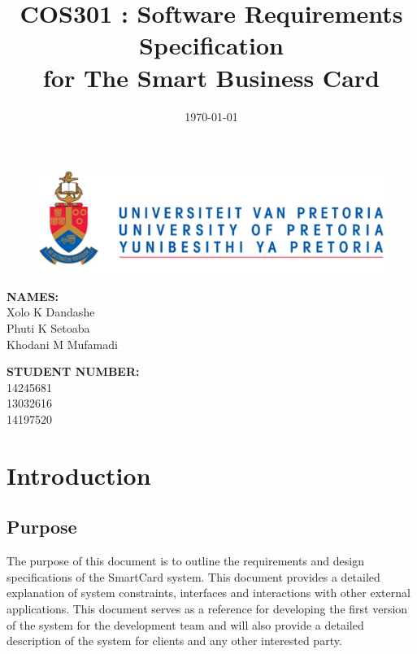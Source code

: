 \documentclass[english]{article}
\title{COS301 : Software Requirements Specification\\
	for The Smart Business Card\\
	}
\date{\today}
\begin{document}
	\maketitle
	\begin{figure}[!t]
		\includegraphics{up_logo.png}
	\end{figure}
	\begin{minipage}{0.4\textwidth}
		\begin{flushleft} \large
			\textbf{NAMES:}\\[0.4cm]
			Xolo K Dandashe\\
			Phuti K Setoaba\\
			Khodani M Mufamadi

		\end{flushleft}
	\end{minipage}
	\begin{minipage}{0.4\textwidth}
		\begin{flushright} \large
			\textbf{STUDENT NUMBER:} \\[0.4cm]
		 	14245681\\ 	
		 	13032616\\	
		 	14197520
		\end{flushright}
	\end{minipage}


	
	\newpage

	\tableofcontents
	\newpage

	

	\section{Introduction}
			

		\subsection{Purpose}
			The purpose of this document is to outline the requirements and design specifications of the SmartCard system. This document provides a detailed explanation of system constraints, interfaces and interactions with other external applications. This document serves as a reference for developing the first version of the system for the development team and will also provide a detailed description of the system for clients and any other interested party.
\end{document}
